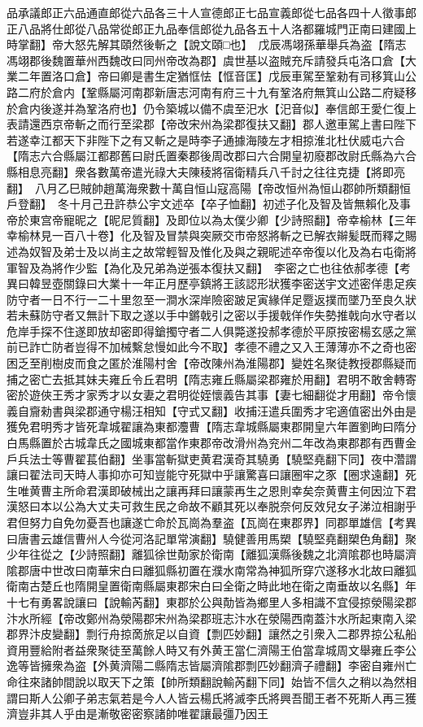 品承議郎正六品通直郎從六品各三十人宣德郎正七品宣義郎從七品各四十人徵事郎正八品將仕郎從八品常從郎正九品奉信郎從九品各五十人洛都羅城門正南曰建國上時掌翻】帝大怒先解其頤然後斬之【說文頤□也】　戊辰馮翊孫華舉兵為盗【隋志馮翊郡後魏置華州西魏改曰同州帝改為郡】虞世基以盗賊充斥請發兵屯洛口倉【大業二年置洛口倉】帝曰卿是書生定猶恇怯【恇音匡】戊辰車駕至鞏勑有司移箕山公路二府於倉内【鞏縣屬河南郡新唐志河南有府三十九有鞏洛府無箕山公路二府疑移於倉内後遂并為鞏洛府也】仍令築城以備不虞至汜水【汜音似】奉信郎王愛仁復上表請還西京帝斬之而行至梁郡【帝改宋州為梁郡復扶又翻】郡人邀車駕上書曰陛下若遂幸江都天下非陛下之有又斬之是時李子通據海陵左才相掠淮北杜伏威屯六合【隋志六合縣屬江都郡舊曰尉氏置秦郡後周改郡曰六合開皇初廢郡改尉氏縣為六合縣相息亮翻】衆各數萬帝遣光祿大夫陳稜將宿衛精兵八千討之往往克捷【將即亮翻】　八月乙巳賊帥趙萬海衆數十萬自恒山寇高陽【帝改恒州為恒山郡帥所類翻恒戶登翻】　冬十月己丑許恭公宇文述卒【卒子恤翻】初述子化及智及皆無賴化及事帝於東宫帝寵昵之【昵尼質翻】及即位以為太僕少卿【少詩照翻】帝幸榆林【三年幸榆林見一百八十卷】化及智及冒禁與突厥交市帝怒將斬之已解衣辮髪既而釋之賜述為奴智及弟士及以尚主之故常輕智及惟化及與之親昵述卒帝復以化及為右屯衛將軍智及為將作少監【為化及兄弟為逆張本復扶又翻】　李密之亡也往依郝孝德【考異曰韓昱壺關錄曰大業十一年正月歷亭鎮將王該認形狀獲李密送宇文述密佯患足疾防守者一日不行一二十里忽至一澗水深岸險密跛足寅緣佯足蹷返撲而墜乃至良久狀若未蘇防守者又無計下取之遂以手中鏘戟引之密以手援戟佯作失勢推戟向水守者以危岸手探不住遂即放却密即得鎗擉守者二人俱斃遂投郝孝德於平原按密楊玄感之黨前已詐亡防者豈得不加械繫怠慢如此今不取】孝德不禮之又入王薄薄亦不之奇也密困乏至削樹皮而食之匿於淮陽村舍【帝改陳州為淮陽郡】變姓名聚徒教授郡縣疑而捕之密亡去抵其妹夫雍丘令丘君明【隋志雍丘縣屬梁郡雍於用翻】君明不敢舍轉寄密於遊俠王秀才家秀才以女妻之君明從姪懷義告其事【妻七細翻從才用翻】帝令懷義自齎勑書與梁郡通守楊汪相知【守式又翻】收捕汪遣兵圍秀才宅適值密出外由是獲免君明秀才皆死韋城翟讓為東都灋曹【隋志韋城縣屬東郡開皇六年置劉昫曰隋分白馬縣置於古城韋氏之國城東都當作東郡帝改滑州為兖州二年改為東郡郡有西曹金戶兵法士等曹翟萇伯翻】坐事當斬獄吏黄君漢奇其驍勇【驍堅堯翻下同】夜中濳謂讓曰翟法司天時人事抑亦可知豈能守死獄中乎讓驚喜曰讓圈牢之豕【圈求遠翻】死生唯黄曹主所命君漢即破械出之讓再拜曰讓蒙再生之恩則幸矣奈黄曹主何因泣下君漢怒曰本以公為大丈夫可救生民之命故不顧其死以奉脱奈何反效兒女子涕泣相謝乎君但努力自免勿憂吾也讓遂亡命於瓦崗為羣盗【瓦崗在東郡界】同郡單雄信【考異曰唐書云雄信曹州人今從河洛記單常演翻】驍健善用馬槊【驍堅堯翻槊色角翻】聚少年往從之【少詩照翻】離狐徐世勣家於衛南【離狐漢縣後魏之北濟隂郡也時屬濟隂郡唐中世改曰南華宋白曰離狐縣初置在濮水南常為神狐所穿穴遂移水北故曰離狐衛南古楚丘也隋開皇置衛南縣屬東郡宋白曰全衛之時此地在衛之南垂故以名縣】年十七有勇畧說讓曰【說輸芮翻】東郡於公與勣皆為鄉里人多相識不宜侵掠滎陽梁郡汴水所經【帝改鄭州為滎陽郡宋州為梁郡班志汴水在滎陽西南蓋汴水所起東南入梁郡界汴皮變翻】剽行舟掠啇旅足以自資【剽匹妙翻】讓然之引衆入二郡界掠公私船資用豐給附者益衆聚徒至萬餘人時又有外黄王當仁濟陽王伯當韋城周文舉雍丘李公逸等皆擁衆為盗【外黄濟陽二縣隋志皆屬濟隂郡剽匹妙翻濟子禮翻】李密自雍州亡命往來諸帥間說以取天下之策【帥所類翻說輸芮翻下同】始皆不信久之稍以為然相謂曰斯人公卿子弟志氣若是今人人皆云楊氏將滅李氏將興吾聞王者不死斯人再三獲濟豈非其人乎由是漸敬密密察諸帥唯翟讓最彊乃因王